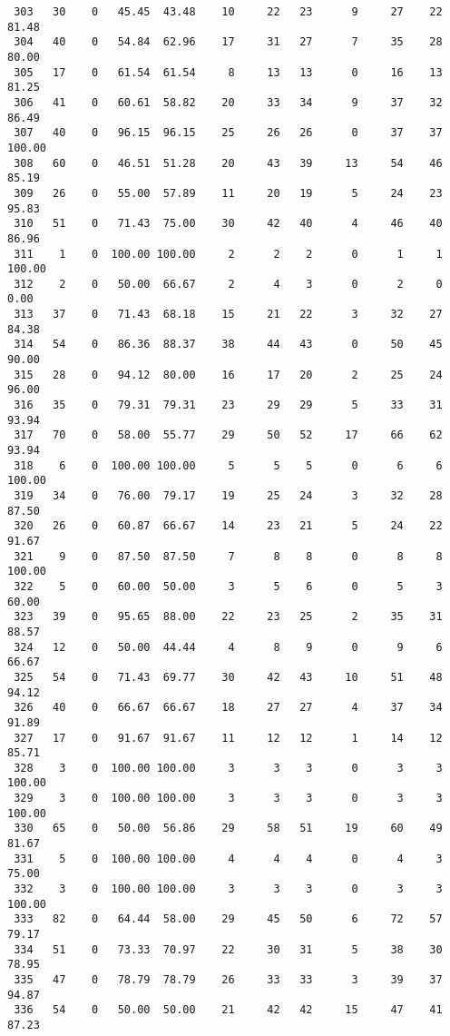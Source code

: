 \begin{verbatim}
 303   30    0   45.45  43.48    10     22   23      9     27    22    81.48
 304   40    0   54.84  62.96    17     31   27      7     35    28    80.00
 305   17    0   61.54  61.54     8     13   13      0     16    13    81.25
 306   41    0   60.61  58.82    20     33   34      9     37    32    86.49
 307   40    0   96.15  96.15    25     26   26      0     37    37   100.00
 308   60    0   46.51  51.28    20     43   39     13     54    46    85.19
 309   26    0   55.00  57.89    11     20   19      5     24    23    95.83
 310   51    0   71.43  75.00    30     42   40      4     46    40    86.96
 311    1    0  100.00 100.00     2      2    2      0      1     1   100.00
 312    2    0   50.00  66.67     2      4    3      0      2     0     0.00
 313   37    0   71.43  68.18    15     21   22      3     32    27    84.38
 314   54    0   86.36  88.37    38     44   43      0     50    45    90.00
 315   28    0   94.12  80.00    16     17   20      2     25    24    96.00
 316   35    0   79.31  79.31    23     29   29      5     33    31    93.94
 317   70    0   58.00  55.77    29     50   52     17     66    62    93.94
 318    6    0  100.00 100.00     5      5    5      0      6     6   100.00
 319   34    0   76.00  79.17    19     25   24      3     32    28    87.50
 320   26    0   60.87  66.67    14     23   21      5     24    22    91.67
 321    9    0   87.50  87.50     7      8    8      0      8     8   100.00
 322    5    0   60.00  50.00     3      5    6      0      5     3    60.00
 323   39    0   95.65  88.00    22     23   25      2     35    31    88.57
 324   12    0   50.00  44.44     4      8    9      0      9     6    66.67
 325   54    0   71.43  69.77    30     42   43     10     51    48    94.12
 326   40    0   66.67  66.67    18     27   27      4     37    34    91.89
 327   17    0   91.67  91.67    11     12   12      1     14    12    85.71
 328    3    0  100.00 100.00     3      3    3      0      3     3   100.00
 329    3    0  100.00 100.00     3      3    3      0      3     3   100.00
 330   65    0   50.00  56.86    29     58   51     19     60    49    81.67
 331    5    0  100.00 100.00     4      4    4      0      4     3    75.00
 332    3    0  100.00 100.00     3      3    3      0      3     3   100.00
 333   82    0   64.44  58.00    29     45   50      6     72    57    79.17
 334   51    0   73.33  70.97    22     30   31      5     38    30    78.95
 335   47    0   78.79  78.79    26     33   33      3     39    37    94.87
 336   54    0   50.00  50.00    21     42   42     15     47    41    87.23

\end{verbatim}
